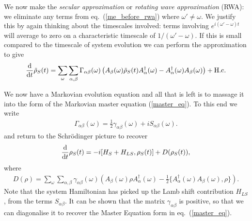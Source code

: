 We now make the \textit{secular approximation} or \textit{rotating wave approximation} (RWA): we eliminate any terms from eq.~(\ref{me_before_rwa}) where $\omega' \neq \omega$. We justify this by again thinking about the timescales involved: terms involving $e^{i(\omega' - \omega)t}$ will average to zero on a characteristic timescale of $1/(\omega' - \omega)$. If this is small compared to the timescale of system evolution we can perform the approximation to give
\begin{align}
  \frac{\mathrm{d}}{\mathrm{d}t} \tilde{\rho}_S(t) = \sum_{\omega} \sum_{\alpha, \beta} \Gamma_{\alpha\beta}(\omega)\left(A_\beta(\omega)\tilde{\rho}_S(t)A^\dagger_\alpha(\omega) - A^\dagger_\alpha(\omega)A_\beta(\omega)\right) + \text{H.c}.
\end{align}

We now have a Markovian evolution equation and all that is left is to massage it into the form of the Markovian master equation (\ref{master_eq}). To this end we write
\begin{align}
  \Gamma_{\alpha \beta}(\omega) = \frac{1}{2}\gamma_{\alpha\beta}(\omega) + i S_{\alpha\beta}(\omega).
\end{align}
and return to the Schr\"odinger picture to recover
\begin{align}
  \frac{\mathrm{d}}{\mathrm{d}t} \rho_S(t) = -i[H_S + H_{LS}, \rho_S(t) ] + D(\rho_S(t)),
\end{align}
where
\begin{align}
 D(\rho) = \sum_\omega \sum_{\alpha, \beta} \gamma_{\alpha\beta}(\omega)\left(A_\beta(\omega)\rho A_\alpha^\dagger(\omega) - \frac{1}{2}\{A^\dagger_\alpha(\omega)A_\beta(\omega), \rho\} \right).
\end{align}
Note that the system Hamiltonian has picked up the Lamb shift contribution $H_{LS}$, from the terms $S_{\alpha\beta}$. It can be shown \cite{b+p} that the matrix $\gamma_{\alpha\beta}$ is positive, so that we can diagonalise it to recover the Master Equation form in eq.~(\ref{master_eq}).


